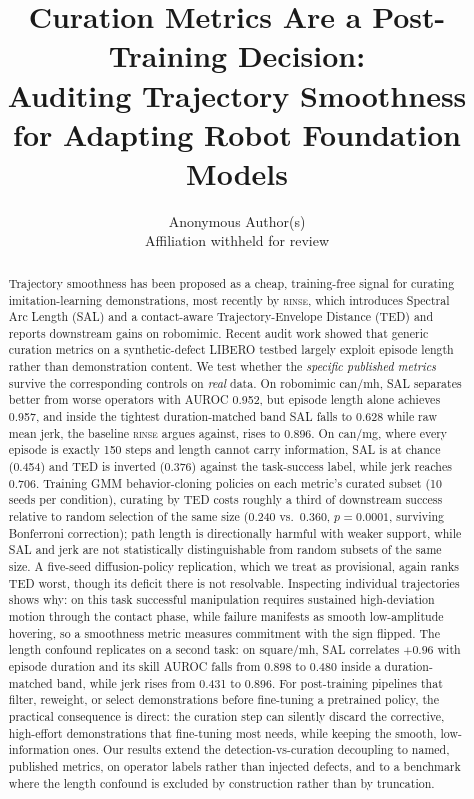 \documentclass{article}
\title{Curation Metrics Are a Post-Training Decision:\\
Auditing Trajectory Smoothness for Adapting Robot Foundation Models}
\author{Anonymous Author(s)\\ \small Affiliation withheld for review}
\date{}
\newcommand{\rinse}{\textsc{rinse}}
\begin{document}
\maketitle

\begin{abstract}
Trajectory smoothness has been proposed as a cheap, training-free signal for
curating imitation-learning demonstrations, most recently by \rinse{}, which
introduces Spectral Arc Length (SAL) and a contact-aware Trajectory-Envelope
Distance (TED) and reports downstream gains on robomimic. Recent audit work
showed that generic curation metrics on a synthetic-defect LIBERO testbed
largely exploit episode length rather than demonstration content. We test
whether the \emph{specific published metrics} survive the corresponding
controls on \emph{real} data. On robomimic can/mh, SAL separates
better from worse operators with AUROC 0.952, but episode length alone
achieves 0.957, and inside the tightest duration-matched band SAL falls to
0.628 while raw mean jerk, the baseline \rinse{} argues
against, rises to 0.896. On can/mg, where every episode is exactly 150
steps and length cannot carry information, SAL is at chance (0.454) and TED
is inverted (0.376) against the task-success label, while jerk reaches
0.706. Training GMM behavior-cloning policies on each metric's curated
subset (10 seeds per condition), curating by TED costs roughly a third of
downstream success relative to random selection of the same size (0.240
vs.\ 0.360, $p{=}0.0001$, surviving Bonferroni correction); path length is
directionally harmful with weaker support, while SAL and jerk are not
statistically distinguishable from random subsets of the same size. A five-seed diffusion-policy replication, which we treat as provisional, again ranks TED worst, though its deficit there is not resolvable.
Inspecting individual trajectories shows why: on this task successful
manipulation requires sustained high-deviation motion through the contact
phase, while failure manifests as smooth low-amplitude hovering, so a
smoothness metric measures commitment with the sign flipped. The length
confound replicates on a second task: on square/mh, SAL correlates $+0.96$
with episode duration and its skill AUROC falls from 0.898 to 0.480 inside a
duration-matched band, while jerk rises from 0.431 to 0.896. For
post-training pipelines that filter, reweight, or select demonstrations
before fine-tuning a pretrained policy, the practical consequence is direct:
the curation step can silently discard the corrective, high-effort
demonstrations that fine-tuning most needs, while keeping the smooth,
low-information ones. Our results extend the detection-vs-curation
decoupling to named, published metrics, on operator labels rather than
injected defects, and to a benchmark where the length confound is excluded
by construction rather than by truncation.
\end{abstract}
\end{document}
